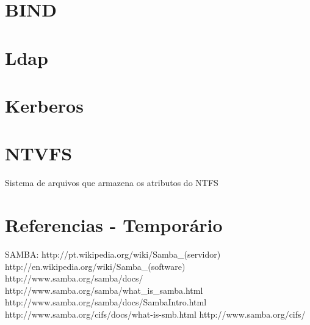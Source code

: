 \section{BIND}

\section{Ldap}

\section{Kerberos}

\section{NTVFS}

Sistema de arquivos que armazena os atributos do NTFS

\section{Referencias - Temporário}
SAMBA:
http://pt.wikipedia.org/wiki/Samba_(servidor)
http://en.wikipedia.org/wiki/Samba_(software)
http://www.samba.org/samba/docs/
http://www.samba.org/samba/what_is_samba.html
http://www.samba.org/samba/docs/SambaIntro.html
http://www.samba.org/cifs/docs/what-is-smb.html
http://www.samba.org/cifs/

